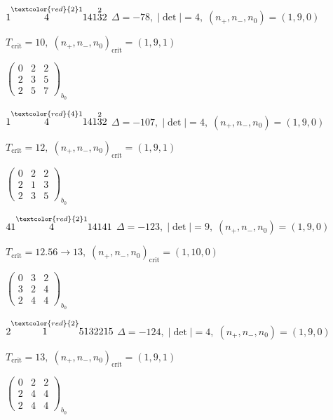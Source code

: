 \documentclass[10pt]{article}
\begin{document}
$1\overset{\textcolor{red}{2}1}{4}141\overset{2}{3}2$ \quad $\Delta=-78,\; |\det|=4,\; (n_+,n_-,n_0)=(1,9,0)$

\hspace{1em}$T_{\text{crit}}=10,\; (n_+,n_-,n_0)_{\text{crit}}=(1,9,1)$

\hspace{2em}$\left(\begin{smallmatrix}0 & 2 & 2 \\ 2 & 3 & 5 \\ 2 & 5 & 7\end{smallmatrix}\right)_{\!b_0}$

$1\overset{\textcolor{red}{4}1}{4}141\overset{2}{3}2$ \quad $\Delta=-107,\; |\det|=4,\; (n_+,n_-,n_0)=(1,9,0)$

\hspace{1em}$T_{\text{crit}}=12,\; (n_+,n_-,n_0)_{\text{crit}}=(1,9,1)$

\hspace{2em}$\left(\begin{smallmatrix}0 & 2 & 2 \\ 2 & 1 & 3 \\ 2 & 3 & 5\end{smallmatrix}\right)_{\!b_0}$

\smallskip

$41\overset{\textcolor{red}{2}1}{4}14141$ \quad $\Delta=-123,\; |\det|=9,\; (n_+,n_-,n_0)=(1,9,0)$

\hspace{1em}$T_{\text{crit}}=12.56 \to 13,\; (n_+,n_-,n_0)_{\text{crit}}=(1,10,0)$

\hspace{2em}$\left(\begin{smallmatrix}0 & 3 & 2 \\ 3 & 2 & 4 \\ 2 & 4 & 4\end{smallmatrix}\right)_{\!b_0}$

\smallskip

$2\overset{\textcolor{red}{2}}{1}5132215$ \quad $\Delta=-124,\; |\det|=4,\; (n_+,n_-,n_0)=(1,9,0)$

\hspace{1em}$T_{\text{crit}}=13,\; (n_+,n_-,n_0)_{\text{crit}}=(1,9,1)$

\hspace{2em}$\left(\begin{smallmatrix}0 & 2 & 2 \\ 2 & 4 & 4 \\ 2 & 4 & 4\end{smallmatrix}\right)_{\!b_0}$
\end{document}
